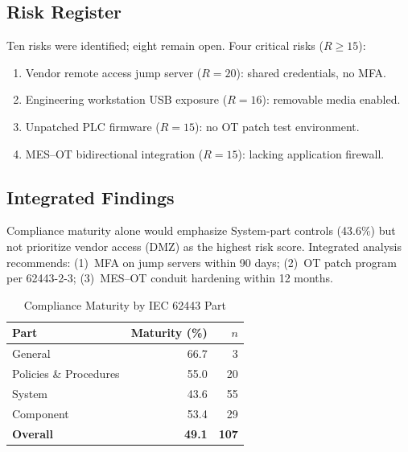 \documentclass[conference]{IEEEtran}
\begin{document}
\subsection{Risk Register}
Ten risks were identified; eight remain open. Four critical risks ($R \geq 15$):
\begin{enumerate}
    \item Vendor remote access jump server ($R=20$): shared credentials, no MFA.
    \item Engineering workstation USB exposure ($R=16$): removable media enabled.
    \item Unpatched PLC firmware ($R=15$): no OT patch test environment.
    \item MES--OT bidirectional integration ($R=15$): lacking application firewall.
\end{enumerate}

\subsection{Integrated Findings}
Compliance maturity alone would emphasize System-part controls (43.6\%) but not prioritize vendor access (DMZ) as the highest risk score. Integrated analysis recommends: (1)~MFA on jump servers within 90 days; (2)~OT patch program per 62443-2-3; (3)~MES--OT conduit hardening within 12 months.


\begin{table}[!t]
\caption{Compliance Maturity by IEC 62443 Part}
\label{tab:maturity}
\centering
\begin{tabular}{lrr}
\hline
Part & Maturity (\%) & $n$ \\
\hline
General & 66.7 & 3 \\
Policies \& Procedures & 55.0 & 20 \\
System & 43.6 & 55 \\
Component & 53.4 & 29 \\
\hline
\textbf{Overall} & \textbf{49.1} & \textbf{107} \\
\hline
\end{tabular}
\end{table}
\end{document}
